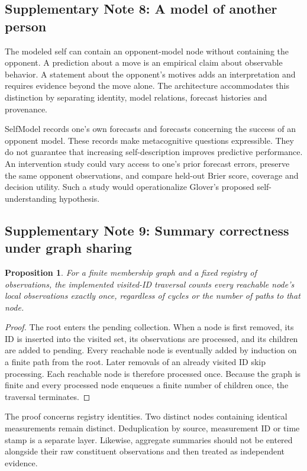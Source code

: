 \documentclass[10pt,a4paper]{article}
\newtheorem{proposition}{Proposition}
\begin{document}
\subsection*{Supplementary Note 8: A model of another person}
The modeled self can contain an opponent-model node without containing the opponent. A prediction about a move is an empirical claim about observable behavior. A statement about the opponent's motives adds an interpretation and requires evidence beyond the move alone. The architecture accommodates this distinction by separating identity, model relations, forecast histories and provenance.

SelfModel records one's own forecasts and forecasts concerning the success of an opponent model. These records make metacognitive questions expressible. They do not guarantee that increasing self-description improves predictive performance. An intervention study could vary access to one's prior forecast errors, preserve the same opponent observations, and compare held-out Brier score, coverage and decision utility. Such a study would operationalize Glover's proposed self-understanding hypothesis.

\subsection*{Supplementary Note 9: Summary correctness under graph sharing}
\begin{proposition}
For a finite membership graph and a fixed registry of observations, the implemented visited-ID traversal counts every reachable node's local observations exactly once, regardless of cycles or the number of paths to that node.
\end{proposition}
\begin{proof}
The root enters the pending collection. When a node is first removed, its ID is inserted into the visited set, its observations are processed, and its children are added to pending. Every reachable node is eventually added by induction on a finite path from the root. Later removals of an already visited ID skip processing. Each reachable node is therefore processed once. Because the graph is finite and every processed node enqueues a finite number of children once, the traversal terminates.
\end{proof}
The proof concerns registry identities. Two distinct nodes containing identical measurements remain distinct. Deduplication by source, measurement ID or time stamp is a separate layer. Likewise, aggregate summaries should not be entered alongside their raw constituent observations and then treated as independent evidence.
\end{document}
